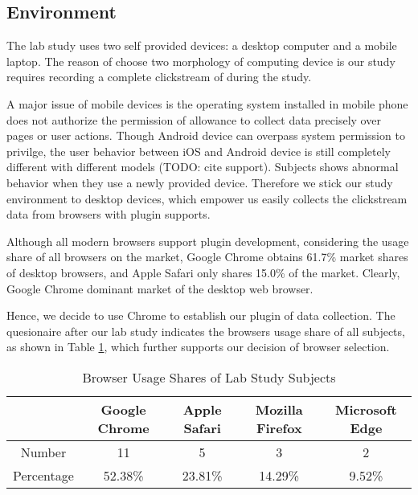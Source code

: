 \subsection{Environment}

The lab study uses two self provided devices: a desktop computer and a mobile laptop.
The reason of choose two morphology of computing device is our study requires recording
a complete clickstream of during the study.

A major issue of mobile devices is the operating system installed in mobile phone does not
authorize the permission of allowance to collect data precisely over pages or user actions.
Though Android device can overpass system permission to privilge, the user behavior 
between iOS and Android device is still completely different with different models (TODO: cite support). 
Subjects shows abnormal behavior when they use a newly provided device. 
Therefore we stick our study environment to desktop devices, 
which empower us easily collects the clickstream data from browsers with plugin supports.

Although all modern browsers support plugin development, considering the usage share of 
all browsers on the market, Google Chrome \cite{wiki2018share} obtains 61.7\% 
market shares of desktop browsers, and Apple Safari only shares
15.0\% of the market. Clearly, Google Chrome dominant market of the desktop web browser.

Hence, we decide to use Chrome to establish our plugin of data collection.
The quesionaire after our lab study indicates the browsers usage share of all subjects, 
as shown in Table \ref{table:sharesubjects}, which further supports our decision of 
browser selection.

\begin{table}[H]
    \small
    \centering
    \setlength{\belowcaptionskip}{10pt}
    \caption{Browser Usage Shares of Lab Study Subjects}
    \begin{tabular}{ccccc}
          \toprule
        & \textbf{Google Chrome} & \textbf{Apple Safari} & \textbf{Mozilla Firefox} & \textbf{Microsoft Edge} \\
          \hline
          Number     & 11 & 5 & 3 & 2 \\
          Percentage & 52.38\% & 23.81\% & 14.29\% & 9.52\% \\
          \bottomrule
    \end{tabular}
    \label{table:sharesubjects}
\end{table}

